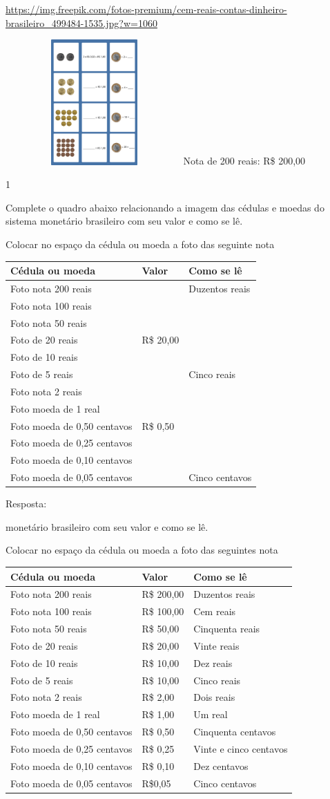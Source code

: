 {\url{https://img.freepik.com/fotos-premium/cem-reais-contas-dinheiro-brasileiro_499484-1535.jpg?w=1060}

\includegraphics[width=2.68333in,height=1.88913in]{media/image71.png}Nota
de 200 reais: R\$ 200,00}


\num{1}

Complete o quadro abaixo relacionando a imagem das cédulas e moedas do
sistema monetário brasileiro com seu valor e como se lê.

Colocar no espaço da cédula ou moeda a foto das seguinte nota

\begin{longtable}[]{@{}lll@{}}
\toprule
Cédula ou moeda & Valor & Como se lê\tabularnewline
\midrule
\endhead
Foto nota 200 reais & & Duzentos reais\tabularnewline
Foto nota 100 reais & &\tabularnewline
Foto nota 50 reais & &\tabularnewline
Foto de 20 reais & R\$ 20,00 &\tabularnewline
Foto de 10 reais & &\tabularnewline
Foto de 5 reais & & Cinco reais\tabularnewline
Foto nota 2 reais & &\tabularnewline
Foto moeda de 1 real & &\tabularnewline
Foto moeda de 0,50 centavos & R\$ 0,50 &\tabularnewline
Foto moeda de 0,25 centavos & &\tabularnewline
Foto moeda de 0,10 centavos & &\tabularnewline
Foto moeda de 0,05 centavos & & Cinco centavos\tabularnewline
\bottomrule
\end{longtable}

Resposta:

monetário brasileiro com seu valor e como se lê.

Colocar no espaço da cédula ou moeda a foto das seguintes nota

\begin{longtable}[]{@{}lll@{}}
\toprule
Cédula ou moeda & Valor & Como se lê\tabularnewline
\midrule
\endhead
Foto nota 200 reais & R\$ 200,00 & Duzentos reais\tabularnewline
Foto nota 100 reais & R\$ 100,00 & Cem reais\tabularnewline
Foto nota 50 reais & R\$ 50,00 & Cinquenta reais\tabularnewline
Foto de 20 reais & R\$ 20,00 & Vinte reais\tabularnewline
Foto de 10 reais & R\$ 10,00 & Dez reais\tabularnewline
Foto de 5 reais & R\$ 10,00 & Cinco reais\tabularnewline
Foto nota 2 reais & R\$ 2,00 & Dois reais\tabularnewline
Foto moeda de 1 real & R\$ 1,00 & Um real\tabularnewline
Foto moeda de 0,50 centavos & R\$ 0,50 & Cinquenta
centavos\tabularnewline
Foto moeda de 0,25 centavos & R\$ 0,25 & Vinte e cinco
centavos\tabularnewline
Foto moeda de 0,10 centavos & R\$ 0,10 & Dez centavos\tabularnewline
Foto moeda de 0,05 centavos & R\$0,05 & Cinco centavos\tabularnewline
\bottomrule
\end{longtable}

